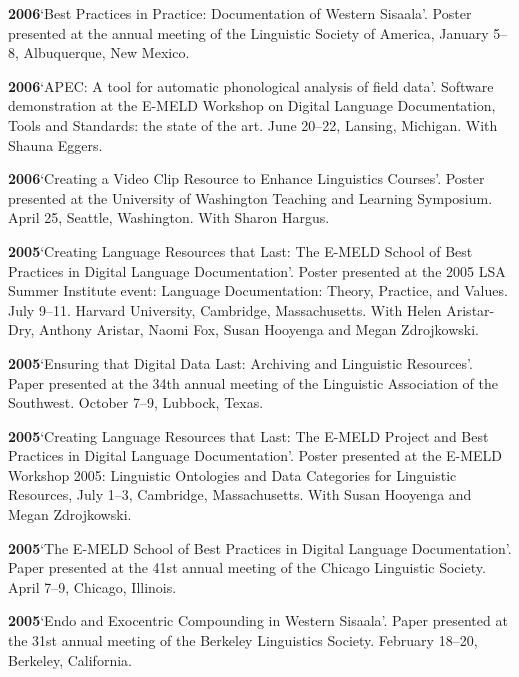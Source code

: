 \documentclass[11pt]{article}
\newcommand{\hangpara}{
 \setlength{\parindent}{0in} %
 \hangindent=0.42in %
}
\begin{document}
\vskip 6pt
\hangpara
{\bf 2006}\hspace{1ex}`Best Practices in Practice: Documentation of Western Sisaala'. Poster presented at the annual meeting of the Linguistic Society of America, January 5--8, Albuquerque, New Mexico.

\vskip 6pt
\hangpara
{\bf 2006}\hspace{1ex}`APEC: A tool for automatic phonological analysis of field data'. Software demonstration at the E-MELD Workshop on Digital Language Documentation, Tools and Standards: the state of the art. June 20--22, Lansing, Michigan. With Shauna Eggers.

\vskip 6pt
\hangpara
{\bf 2006}\hspace{1ex}`Creating a Video Clip Resource to Enhance Linguistics Courses'. Poster presented at the University of Washington Teaching and Learning Symposium. April 25, Seattle, Washington. With Sharon Hargus.

\vskip 6pt
\hangpara
{\bf 2005}\hspace{1ex}`Creating Language Resources that Last: The E-MELD School of Best Practices in Digital Language Documentation'. Poster presented at the 2005 LSA Summer Institute event: Language Documentation: Theory, Practice, and Values. July 9--11. Harvard University, Cambridge, Massachusetts. With Helen Aristar-Dry, Anthony Aristar, Naomi Fox, Susan Hooyenga and Megan Zdrojkowski.

\vskip 6pt
\hangpara
{\bf 2005}\hspace{1ex}`Ensuring that Digital Data Last: Archiving and Linguistic Resources'. Paper presented at the 34th annual meeting of the Linguistic Association of the Southwest. October 7--9, Lubbock, Texas. 
 
\vskip 6pt
\hangpara
{\bf 2005}\hspace{1ex}`Creating Language Resources that Last: The E-MELD Project and Best Practices in Digital Language Documentation'. Poster presented at the E-MELD Workshop 2005: Linguistic Ontologies and Data Categories for Linguistic Resources, July 1--3, Cambridge, Massachusetts. With Susan Hooyenga and Megan Zdrojkowski.

\vskip 6pt
\hangpara
{\bf 2005}\hspace{1ex}`The E-MELD School of Best Practices in Digital Language Documentation'. Paper presented at the 41st annual meeting of the Chicago Linguistic Society. April 7--9, Chicago, Illinois.

\vskip 6pt
\hangpara
{\bf 2005}\hspace{1ex}`Endo and Exocentric Compounding in Western Sisaala'. Paper presented at the 31st annual meeting of the Berkeley Linguistics Society. February 18--20, Berkeley, California.
\end{document}
